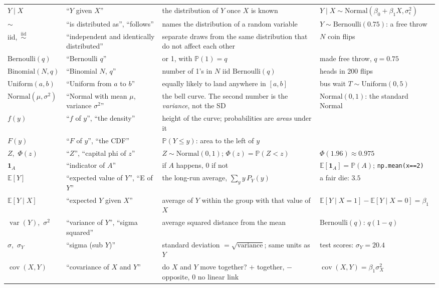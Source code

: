 \documentclass[11pt]{article}
\newcommand{\E}{\mathbb{E}}
\newcommand{\Var}{\operatorname{var}}
\newcommand{\Cov}{\operatorname{cov}}
\renewcommand{\P}{\mathbb{P}}
\newcommand{\given}{\mid}
\newcommand{\Bern}{\text{Bernoulli}}
\newcommand{\Bin}{\text{Binomial}}
\newcommand{\Norm}{\text{Normal}}
\newcommand{\py}[1]{\texttt{#1}}
\begin{document}
{\begin{longtable}{@{}>{\raggedright\arraybackslash}p{2.5cm}>{\raggedright\arraybackslash}p{3.0cm}>{\raggedright\arraybackslash}p{5.5cm}>{\raggedright\arraybackslash}p{4.5cm}@{}}
$Y\given X$ & ``$Y$ given $X$'' & the distribution of $Y$ once $X$ is known & $Y\given X\sim\Norm(\beta_0+\beta_1X,\sigma_\epsilon^2)$\\
$\sim$ & ``is distributed as'', ``follows'' & names the distribution of a random variable & $Y\sim\Bern(0.75)$: a free throw\\
iid,\ $\overset{\text{iid}}{\sim}$ & ``independent and identically distributed'' & separate draws from the same distribution that do not affect each other & $N$ coin flips\\
$\Bern(q)$ & ``Bernoulli $q$'' & 0 or 1, with $\P(1)=q$ & made free throw, $q=0.75$\\
$\Bin(N,q)$ & ``Binomial $N$, $q$'' & number of 1's in $N$ iid $\Bern(q)$ & heads in 200 flips\\
$\text{Uniform}(a,b)$ & ``Uniform from $a$ to $b$'' & equally likely to land anywhere in $[a,b]$ & bus wait $T\sim\text{Uniform}(0,5)$\\
$\Norm(\mu,\sigma^2)$ & ``Normal with mean $\mu$, variance $\sigma^2$'' & the bell curve. The second number is the \emph{variance}, not the SD & $\Norm(0,1)$: the standard Normal\\
$f(y)$ & ``$f$ of $y$'', ``the density'' & height of the curve; probabilities are \emph{areas} under it & \\
$F(y)$ & ``$F$ of $y$'', ``the CDF'' & $\P(Y\le y)$: area to the left of $y$ & \\
$Z$,\ $\Phi(z)$ & ``$Z$'', ``capital phi of $z$'' & $Z\sim\Norm(0,1)$; $\Phi(z)=\P(Z<z)$ & $\Phi(1.96)\approx0.975$\\
$\mathbf 1_A$ & ``indicator of $A$'' & 1 if $A$ happens, 0 if not & $\E[\mathbf 1_A]=\P(A)$; \py{np.mean(x==2)}\\
$\E[Y]$ & ``expected value of $Y$'', ``E of $Y$'' & the long-run average, $\sum_y y\,P_Y(y)$ & a fair die: $3.5$\\
$\E[Y\given X]$ & ``expected $Y$ given $X$'' & average of $Y$ within the group with that value of $X$ & $\E[Y\given X{=}1]-\E[Y\given X{=}0]=\beta_1$\\
$\Var(Y)$,\ $\sigma^2$ & ``variance of $Y$'', ``sigma squared'' & average squared distance from the mean & $\Bern(q)$: $q(1-q)$\\
$\sigma$,\ $\sigma_Y$ & ``sigma (sub $Y$)'' & standard deviation $=\sqrt{\text{variance}}$; same units as $Y$ & test scores: $\sigma_Y=20.4$\\
$\Cov(X,Y)$ & ``covariance of $X$ and $Y$'' & do $X$ and $Y$ move together? $+$ together, $-$ opposite, $0$ no linear link & $\Cov(X,Y)=\beta_1\sigma_X^2$\\

\end{longtable}}
\end{document}
